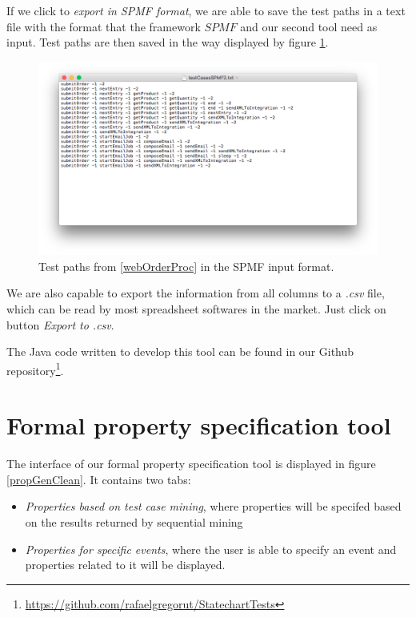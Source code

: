 If we click to \textit{export in SPMF format}, we are able to save the test paths in a text file with the format that the framework $SPMF$ and our second tool need as input. Test paths are then saved in the way displayed by figure \ref{resultsSPMFFile}.

\begin{figure}[htb]
\centering
\includegraphics[width=\textwidth]{figuras/resultsSPMFFile}
\caption{\label{resultsSPMFFile} Test paths from \ref{webOrderProc} in the SPMF input format.}
\end{figure}

We are also capable to export the information from all columns to a \textit{.csv} file, which can be read by most spreadsheet softwares in the market. Just click on button \textit{Export to .csv}.

The Java code written to develop this tool can be found in our Github repository\footnote{\url{https://github.com/rafaelgregorut/StatechartTests}}.

\section{Formal property specification tool}

The interface of our formal property specification tool is displayed in figure \ref{propGenClean}. It contains two tabs: 
\begin{itemize}
\item \textit{Properties based on test case mining}, where properties will be specifed based on the results returned by sequential mining
\item \textit{Properties for specific events}, where the user is able to specify an event and properties related to it will be displayed.
\end{itemize}

